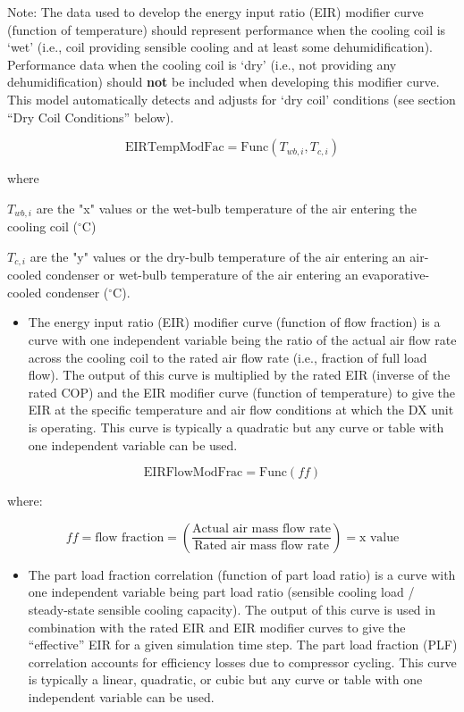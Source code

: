 Note: The data used to develop the energy input ratio (EIR) modifier curve (function of temperature) should represent performance when the cooling coil is `wet' (i.e., coil providing sensible cooling and at least some dehumidification). Performance data when the cooling coil is `dry' (i.e., not providing any dehumidification) should \textbf{not} be included when developing this modifier curve. This model automatically detects and adjusts for `dry coil' conditions (see section ``Dry Coil Conditions'' below).

\begin{equation}
\text{EIRTempModFac} = \text{Func}\left(T_{wb,i},T_{c,i}\right)
\label{eq:CoilEIRTempModFac}
\end{equation}

where

\({T_{wb,i}}\) are the "x" values or the wet-bulb temperature of the air entering the cooling coil (\(^{\circ}\)C)

\({T_{c,i}}\) are the "y" values or the dry-bulb temperature of the air entering an air-cooled condenser or wet-bulb temperature of the air entering an evaporative-cooled condenser (\(^{\circ}\)C).

\begin{itemize}
\tightlist
\item
  The energy input ratio (EIR) modifier curve (function of flow fraction) is a curve with one independent variable being the ratio of the actual air flow rate across the cooling coil to the rated air flow rate (i.e., fraction of full load flow). The output of this curve is multiplied by the rated EIR (inverse of the rated COP) and the EIR modifier curve (function of temperature) to give the EIR at the specific temperature and air flow conditions at which the DX unit is operating. This curve is typically a quadratic but any curve or table with one independent variable can be used.
\end{itemize}

\begin{equation}
\text{EIRFlowModFrac} = \text{Func}\left(ff\right)
\end{equation}

where:

\begin{equation}
ff = \text{flow fraction} = \left( \frac{\text{Actual air mass flow rate}}{\text{Rated air mass flow rate}} \right) = \text{x value}
\end{equation}

\begin{itemize}
\tightlist
\item
  The part load fraction correlation (function of part load ratio) is a curve with one independent variable being part load ratio (sensible cooling load / steady-state sensible cooling capacity). The output of this curve is used in combination with the rated EIR and EIR modifier curves to give the ``effective'' EIR for a given simulation time step. The part load fraction (PLF) correlation accounts for efficiency losses due to compressor cycling. This curve is typically a linear, quadratic, or cubic but any curve or table with one independent variable can be used.
\end{itemize}

